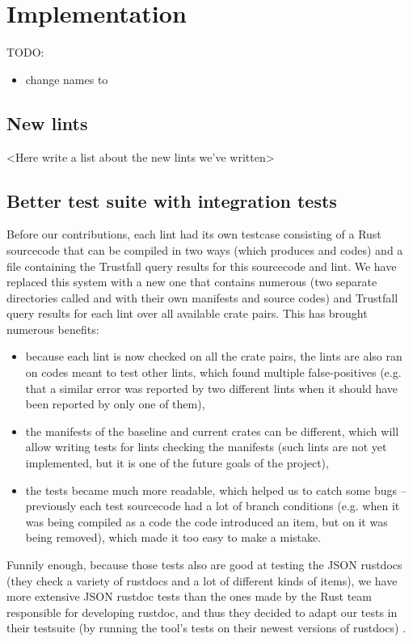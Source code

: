 \documentclass[licencjacka,en]{pracamgr}
\begin{document}

\chapter{Implementation}\label{r:chapter_implementation}

TODO:
\begin{itemize}
	\item change names to 
\end{itemize}

\section{New lints}\label{r:section_new_lints}

<Here write a list about the new lints we've written>

\section{Better test suite with integration tests}\label{r:section_test_suite}

Before our contributions, each lint had its own testcase consisting of
a Rust sourcecode that can be compiled in two ways (which produces
 and  codes) and a file containing the Trustfall query results
for this sourcecode and lint.
We have replaced this system with a new one that contains numerous 
(two separate directories called  and  with their own
manifests and source codes) and Trustfall query results for each lint over all
available crate pairs. This has brought numerous benefits:
\begin{itemize}
	\item because each lint is now checked on all the crate pairs,
		the lints are also ran on codes meant to test other lints,
		which found multiple false-positives
		(e.g. that a similar error was reported by two different lints
		when it should have been reported by only one of them),
	\item the manifests of the baseline and current crates can be different,
		which will allow writing tests for lints checking the manifests
		(such lints are not yet implemented, but it is one of the future goals
		of the project),
	\item the tests became much more readable, which helped us to catch some bugs
		-- previously each test sourcecode had a lot of branch conditions
		(e.g. when it was being compiled as a  code
		the code introduced an item, but on  it was being removed),
		which made it too easy to make a mistake.
\end{itemize}
Funnily enough, because those tests also are good at testing the JSON rustdocs
(they check a variety of rustdocs and a lot of different kinds of items),
we have more extensive JSON rustdoc tests than the ones made by the
Rust team responsible for developing rustdoc,
and thus they decided to adapt our tests in their testsuite
(by running the tool's tests on their newest versions of rustdocs) \cite{issue-rustdoc-our-tests}.
\end{document}
